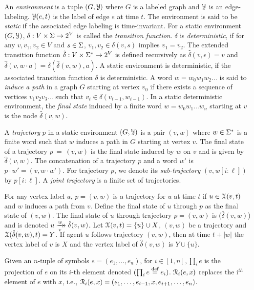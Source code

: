 An \emph{environment} is a tuple $(G,\mathcal{Y})$ where $G$ is a labeled graph and $\mathcal{Y}$ is an edge-labeling. $\mathcal{Y}(e,t)$ is the label of edge $e$ at time $t$. The environment is said to be \emph{static} if the associated edge labeling is time-invariant. 
For a static environment $(G,\mathcal{Y})$, $\delta: V \times \Sigma \to 2^V$ is called the \emph{transition function}. $\delta$ is \emph{deterministic}, if for any $v,v_1,v_2 \in V$ and $s \in \Sigma$, $v_1,v_2 \in \delta(v,s)$ implies $v_1 = v_2$. 
The extended transition function $\hat{\delta}: V \times \Sigma^* \to 2^V$ is defined recursively as $\hat{\delta}(v,\epsilon) = v$ and $\hat{\delta}(v,w\cdot a) = \delta(\hat{\delta}(v,w),a)$. A static environment is deterministic, if the associated transition function $\delta$ is deterministic.
A word $w = w_0w_1w_2\dots$ is said to \emph{induce a path} in a graph $G$ starting at vertex $v_0$ if there exists a sequence of vertices $v_1v_2v_3\dots$ such that $v_i \in \delta(v_{i-1},w_{i-1})$. In a static deterministic environment, the \emph{final state} induced by a finite word $w = w_0w_1\dots w_n$ starting at $v$ is the node $\hat{\delta}(v,w)$.

A \emph{trajectory} $p$ in a static environment $(G,\mathcal{Y})$ is a pair $(v,w)$ where $w \in \Sigma^*$ is a finite word such that $w$ induces a path in $G$ starting at vertex $v$. The final state of a trajectory $p~=~(v,w)$ is the final state induced by $w$ on $v$ and is given by $\hat{\delta}(v,w)$.  The concatenation of a trajectory $p$ and a word $w'$ is $p\cdot w' = (v,w\cdot w')$.  For trajectory $p$, we denote its \emph{sub-trajectory} $(v,w[i:\ell])$ by $p[i:\ell]$. 
A \emph{joint trajectory} is a finite set of trajectories. 

For any vertex label $u$, $p=(v,w)$ is a trajectory for $u$ at time $t$ if $u \in \mathcal{X}(v,t)$ and $w$ induces a path from $v$. Define the final state of $u$ through $p$ as the final state of $(v,w)$. The final state of $u$ through trajectory $p = (v,w)$ is ($\hat{\delta}(v,w)$) and is denoted $u \dhxrightarrow[v]{w} \hat{\delta}(v,w)$.
Let $\mathcal{X}(v,t) = \{u\} \cup X$, $(v,w)$ be a trajectory and $\mathcal{X}(\hat{\delta}(v,w),t) = Y$. If agent $u$ follows trajectory $(v,w)$, then at time $t+|w|$ the vertex label of $v$ is $X$ and the vertex label of $\hat{\delta}(v,w)$ is $Y \cup \{u\}$.  
 
Given  an $n$-tuple of  symbols $e =  (e_1,\dots,e_n)$,  for $i \in [1,n],\prod_i e$ is the projection of $e$ on its $i$-th element denoted $(\prod_i e \stackrel{\text{def}}{=} e_i)$. $\mathcal{R}_i(e,x)$ replaces the i$^{th}$ element of $e$ with $x$, i.e., $\mathcal{R}_i(e,x) = (e_1,\dots,e_{i-1},x,e_{i+1},\dots,e_n)$.
